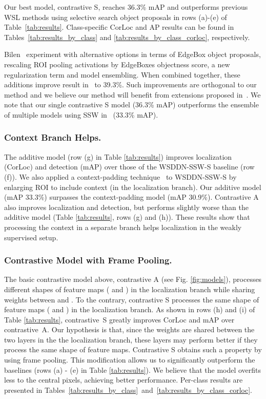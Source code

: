 \documentclass[runningheads]{llncs}
\begin{document}
Our best model, contrastive S, reaches 36.3\% mAP and outperforms previous WSL methods using selective search object proposals in rows (a)-(e) of Table~\ref{tab:results}.
Class-specific CorLoc and AP results can be found in Tables~\ref{tab:results_by_class} and \ref{tab:results_by_class_corloc}, respectively.

Bilen~\etal\cite{Bilen:2015uo} experiment with alternative options in terms of EdgeBox object proposals, rescaling ROI pooling activations by EdgeBoxes objectness score, a new regularization term and model ensembling. When combined together, these additions improve result in~\cite{Bilen:2015uo} to 39.3\%. Such improvements are orthogonal to our method and we believe our method will benefit from extensions proposed in~\cite{Bilen:2015uo}. We note that our single contrastive S model (36.3\% mAP) outperforms the ensemble of multiple models using SSW in~\cite{Bilen:2015uo} (33.3\% mAP).




\subsubsection{Context Branch Helps.} 

The additive model (row (g) in Table \ref{tab:results}) improves localization (CorLoc) and detection (mAP)  over those of  the WSDDN-SSW-S baseline (row (f)). We also applied a context-padding technique~\cite{Girshick:2016ig} to WSDDN-SSW-S by enlarging ROI to include context (in the localization branch). Our additive model (mAP 33.3\%) surpasses the context-padding model (mAP 30.9\%).
Contrastive A also improves localization and detection, but performs slightly worse than the additive model (Table \ref{tab:results}, rows (g) and (h)). 
These results show that processing the context in a separate branch helps 
localization in the weakly supervised setup.



\subsubsection{Contrastive Model with Frame Pooling.}

The basic contrastive model above, contrastive A (see Fig. \ref{fig:models}), processes different shapes of feature maps ( and ) in the localization branch while sharing weights between  and . To the contrary, contrastive S processes the same shape of feature maps ( and ) in the localization branch. As shown in rows (h) and (i) of Table \ref{tab:results}, contrastive~S greatly improves CorLoc and mAP over contrastive~A. Our hypothesis is that, since the weights are shared between the two layers in the the localization
branch, these layers may perform better if they process the same shape of feature maps. Contrastive S obtains such a property by using frame pooling.  
This modification allows us to significantly outperform the baselines (rows (a) - (e) in Table \ref{tab:results}). 
We believe that the model overfits less to the central pixels, achieving better performance.
Per-class results are presented in Tables~\ref{tab:results_by_class}~and~\ref{tab:results_by_class_corloc}.
\end{document}
